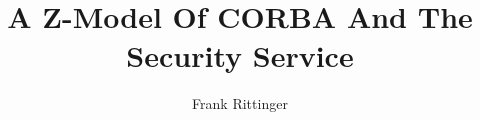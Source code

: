 \documentclass[a4paper,11pt,bibtotoc,idxtotoc]{scrartcl}
\title{A Z-Model Of CORBA And The Security Service}
\author{Frank Rittinger}
\begin{document}
\maketitle
\tableofcontents

\sloppy












\printindex
\end{document}
